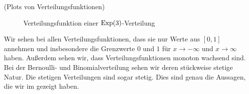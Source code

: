 \begin{Beispiel}{(Plots von Verteilungsfunktionen)}
\begin{minipage}{0.5\linewidth}
\begin{figure}[H]
\begin{center}
\vspace*{-.3\baselineskip}
\caption{\centering Verteilungsfunktion einer $\operatorname{Exp}(3)$-Verteilung}
\vspace*{-.3\baselineskip}
\end{center}
\end{figure}
\end{minipage}

Wir sehen bei allen Verteilungsfunktionen, dass sie nur Werte aus $[0, 1]$ annehmen und insbesondere die Grenzwerte $0$ und $1$ für $x \rightarrow -\infty$ und $x \rightarrow \infty$ haben. Außerdem sehen wir, dass Verteilungsfunktionen monoton wachsend sind. Bei der Bernoulli- und Binomialverteilung sehen wir deren stückweise stetige Natur. Die stetigen Verteilungen sind sogar stetig. Dies sind genau die Aussagen, die wir im \hyperlink{Satz:EigVertFun}{} gezeigt haben.
\end{Beispiel}
